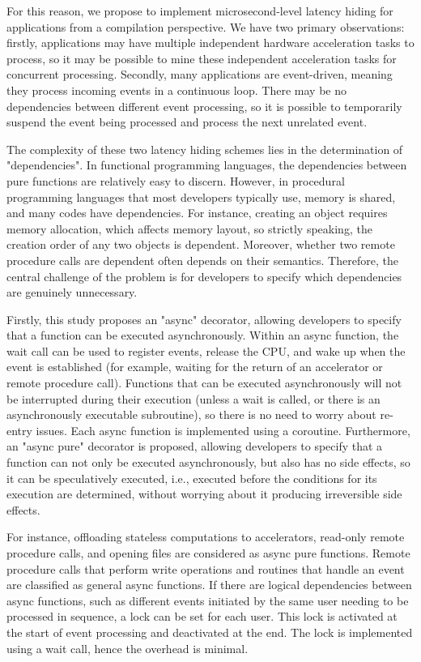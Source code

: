 For this reason, we propose to implement microsecond-level latency hiding for applications from a compilation perspective. We have two primary observations: firstly, applications may have multiple independent hardware acceleration tasks to process, so it may be possible to mine these independent acceleration tasks for concurrent processing. Secondly, many applications are event-driven, meaning they process incoming events in a continuous loop. There may be no dependencies between different event processing, so it is possible to temporarily suspend the event being processed and process the next unrelated event.

The complexity of these two latency hiding schemes lies in the determination of "dependencies". In functional programming languages, the dependencies between pure functions are relatively easy to discern. However, in procedural programming languages that most developers typically use, memory is shared, and many codes have dependencies. For instance, creating an object requires memory allocation, which affects memory layout, so strictly speaking, the creation order of any two objects is dependent. Moreover, whether two remote procedure calls are dependent often depends on their semantics. Therefore, the central challenge of the problem is for developers to specify which dependencies are genuinely unnecessary.

Firstly, this study proposes an "async" decorator, allowing developers to specify that a function can be executed asynchronously. Within an async function, the wait call can be used to register events, release the CPU, and wake up when the event is established (for example, waiting for the return of an accelerator or remote procedure call). Functions that can be executed asynchronously will not be interrupted during their execution (unless a wait is called, or there is an asynchronously executable subroutine), so there is no need to worry about re-entry issues. Each async function is implemented using a coroutine. Furthermore, an "async pure" decorator is proposed, allowing developers to specify that a function can not only be executed asynchronously, but also has no side effects, so it can be speculatively executed, i.e., executed before the conditions for its execution are determined, without worrying about it producing irreversible side effects.

For instance, offloading stateless computations to accelerators, read-only remote procedure calls, and opening files are considered as async pure functions. Remote procedure calls that perform write operations and routines that handle an event are classified as general async functions. If there are logical dependencies between async functions, such as different events initiated by the same user needing to be processed in sequence, a lock can be set for each user. This lock is activated at the start of event processing and deactivated at the end. The lock is implemented using a wait call, hence the overhead is minimal.

